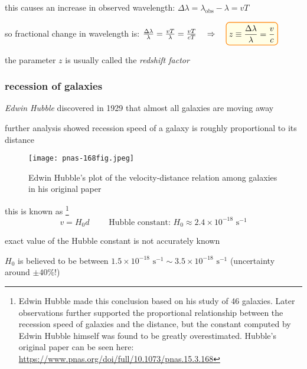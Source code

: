 this causes an increase in observed wavelength: $\Delta \lambda = \lambda_\text{obs} - \lambda = v T$

so fractional change in wavelength is: $\frac{\Delta \lambda}{\lambda} = \frac{vT}{\lambda} = \frac{vT}{cT} \RA \boxed{z \equiv \frac{\Delta \lambda}{\lambda} = \frac{v}{c}}$

the parameter $z$ is usually called the \emph{redshift factor}


\subsubsection{recession of galaxies}

\emph{Edwin Hubble} discovered in 1929 that almost all galaxies are moving away

further analysis showed recession speed of a galaxy is roughly proportional to its distance

\begin{figure}[ht]
    \centering
    \texttt{[image: pnas-168fig.jpeg]}

	Edwin Hubble's plot of the velocity-distance relation among galaxies in his original paper
	\vspace*{-12pt}
\end{figure}


this is known as \footnote{Edwin Hubble made this conclusion based on his study of 46 galaxies. Later observations further supported the proportional relationship between the recession speed of galaxies and the distance, but the constant computed by Edwin Hubble himself was found to be greatly overestimated. Hubble's original paper can be seen here: \url{https://www.pnas.org/doi/full/10.1073/pnas.15.3.168}}
\begin{equation*}
	\boxed{v = H_0 d} \qquad \text{ Hubble constant: } H_0 \approx 2.4 \times10^{-18} \text{ s}^{-1}
\end{equation*}

\cmt exact value of the Hubble constant is not accurately known

$H_0$ is believed to be between $1.5 \times10^{-18} \text{ s}^{-1} \sim 3.5 \times10^{-18}\text{ s}^{-1}$ (uncertainty around $\pm 40\%$!)



